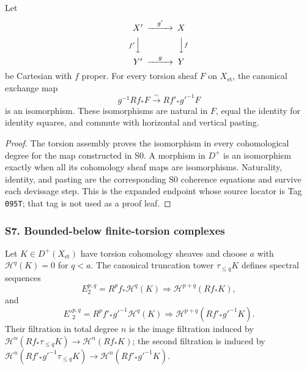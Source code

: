 \begin{proposition}
\label{prop:weil-proet-finite-proper-base-change}
Let
\[
\begin{CD}
X'@>{g'}>>X\\
@V{f'}VV @VV{f}V\\
Y'@>{g}>>Y
\end{CD}
\]
be Cartesian with $f$ proper.  For every torsion sheaf $F$ on
$X_{\mathrm{et}}$, the canonical exchange map
\[
 g^{-1}Rf_*F\xrightarrow{\sim}Rf'_*g'^{-1}F
\]
is an isomorphism.  These isomorphisms are natural in $F$, equal the identity
for identity squares, and commute with horizontal and vertical pasting.
\end{proposition}
\begin{proof}

The torsion assembly proves the isomorphism in every cohomological degree for
the map constructed in S0.  A morphism in $D^+$ is an isomorphism exactly when
all its cohomology sheaf maps are isomorphisms.  Naturality, identity, and
pasting are the corresponding S0 coherence equations and survive each
devissage step.  This is the expanded endpoint whose source locator is Tag
\texttt{095T}; that tag is not used as a proof leaf.
\end{proof}



\subsubsection{S7. Bounded-below finite-torsion complexes}

\begin{definition}
\label{def:weil-pbc-hypercohomology-filtrations}
Let $K\in D^+(X_{\mathrm{et}})$ have torsion cohomology sheaves and choose
$a$ with $\mathcal H^q(K)=0$ for $q<a$.  The canonical truncation tower
$\tau_{\leq q}K$ defines spectral sequences
\[
 E_2^{p,q}=R^pf_*\mathcal H^q(K)\Longrightarrow
 \mathcal H^{p+q}(Rf_*K),
\]
and
\[
 {E'}_2^{p,q}=R^pf'_*g'^{-1}\mathcal H^q(K)\Longrightarrow
 \mathcal H^{p+q}(Rf'_*g'^{-1}K).
\]
Their filtration in total degree $n$ is the image filtration induced by
$\mathcal H^n(Rf_*\tau_{\leq q}K)\to\mathcal H^n(Rf_*K)$; the second
filtration is induced by
$\mathcal H^n(Rf'_*g'^{-1}\tau_{\leq q}K)\to
\mathcal H^n(Rf'_*g'^{-1}K)$.
\end{definition}

